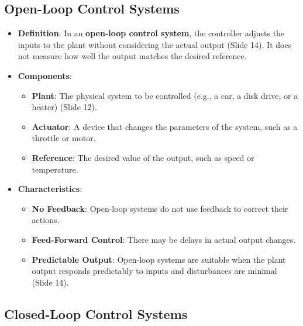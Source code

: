 \documentclass[
  14pt,
  a4paper,
  numbers=noendperiod,
  headinclude=true,
  footinclude=true,
  DIV=calc]{scrreprt}
\begin{document}
\subsection{Open-Loop Control Systems}\label{open-loop-control-systems}

\begin{itemize}
\item
  \textbf{Definition}: In an \textbf{open-loop control system}, the
  controller adjusts the inputs to the plant without considering the
  actual output (Slide 14). It does not measure how well the output
  matches the desired reference.
\item
  \textbf{Components}:

  \begin{itemize}
  \item
    \textbf{Plant}: The physical system to be controlled (e.g., a car, a
    disk drive, or a heater) (Slide 12).
  \item
    \textbf{Actuator}: A device that changes the parameters of the
    system, such as a throttle or motor.
  \item
    \textbf{Reference}: The desired value of the output, such as speed
    or temperature.
  \end{itemize}
\item
  \textbf{Characteristics}:

  \begin{itemize}
  \item
    \textbf{No Feedback}: Open-loop systems do not use feedback to
    correct their actions.
  \item
    \textbf{Feed-Forward Control}: There may be delays in actual output
    changes.
  \item
    \textbf{Predictable Output}: Open-loop systems are suitable when the
    plant output responds predictably to inputs and disturbances are
    minimal (Slide 14).
  \end{itemize}
\end{itemize}

\subsection{Closed-Loop Control
Systems}\label{closed-loop-control-systems}
\end{document}
